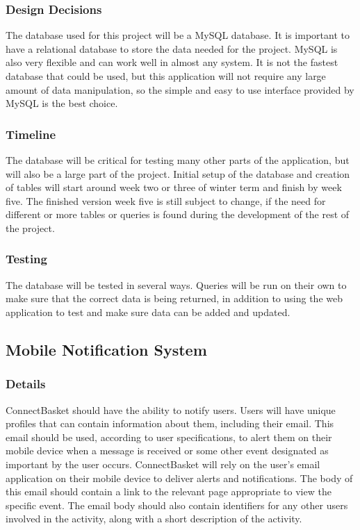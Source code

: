 \documentclass[onecolumn, draftclsnofoot,10pt, compsoc]{IEEEtran}
\begin{document}
\subsubsection{Design Decisions}
The database used for this project will be a MySQL database. It is important to have a relational database to store the data needed for the project. MySQL is also very flexible and can work well in almost any system. It is not the fastest database that could be used, but this application will not require any large amount of data manipulation, so the simple and easy to use interface provided by MySQL is the best choice.

\subsubsection{Timeline}
The database will be critical for testing many other parts of the application, but will also be a large part of the project. Initial setup of the database and creation of tables will start around week two or three of winter term and finish by week five. The finished version week five is still subject to change, if the need for different or more tables or queries is found during the development of the rest of the project.


\subsubsection{Testing}
The database will be tested in several ways. Queries will be run on their own to make sure that the correct data is being returned, in addition to using the web application to test and make sure data can be added and updated.

\subsection{Mobile Notification System}

\subsubsection{Details}
ConnectBasket should have the ability to notify users. Users will have unique profiles that can contain information about them, including their email. This email should be used, according to user specifications, to alert them on their mobile device when a message is received or some other event designated as important by the user occurs. ConnectBasket will rely on the user's email application on their mobile device to deliver alerts and notifications. The body of this email should contain a link to the relevant page appropriate to view the specific event. The email body should also contain identifiers for any other users involved in the activity, along with a short description of the activity.
\end{document}
